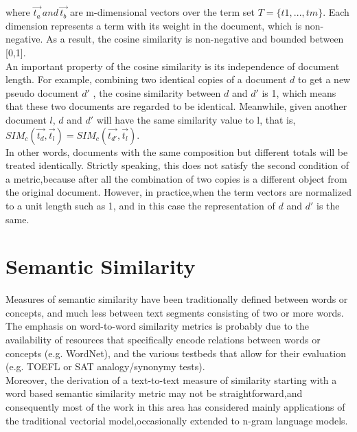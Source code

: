 where $\overrightarrow{t_{a}} \,and\, \overrightarrow{t_{b}}$ are m-dimensional vectors over the term set $T = \{t1 , . . . , tm \}$. Each dimension represents a term with its weight in the document, which is non-negative. As a result, the cosine similarity is non-negative and bounded between [0,1].\\
An important property of the cosine similarity is its independence of document length. For example, combining two identical copies of a document $d$ to get a new pseudo document $d'$ , the cosine similarity between $d$ and $d'$ is 1, which means that these two documents are regarded to be identical. Meanwhile, given another document $l$, $d$ and $d'$ will have the same similarity value to l, that is, 
$SIM_{c}(\vec{t_{d}},\vec{t_{l}})= SIM_{c}(\vec{t_{d'}},\vec{t_{l}})$.\\ 
In other words, documents with the same composition but different totals will be treated identically. Strictly speaking, this does not satisfy the second condition of a metric,because after all the combination of two copies is a different object from the original document. However, in practice,when the term vectors are normalized to a unit length such as 1, and in this case the representation of $d$ and $d'$ is the same.


\section{Semantic Similarity}
\label {semanticSim}
Measures of semantic similarity have been traditionally defined between words or concepts, and much less between text segments consisting of two or more words. The emphasis on word-to-word similarity metrics is probably due to the availability of resources that specifically encode relations between words or concepts (e.g. WordNet), and the various testbeds that allow for their evaluation (e.g. TOEFL or SAT analogy/synonymy tests). \\
Moreover, the derivation of a text-to-text measure of similarity starting with a word based semantic similarity metric may not be straightforward,and consequently most of the work in this area has considered mainly applications of the traditional vectorial model,occasionally extended to n-gram language models\citep{semantic}.\\

